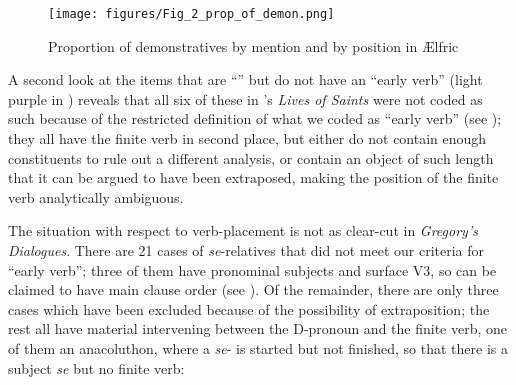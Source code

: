 \documentclass[output=paper,colorlinks,citecolor=brown]{langscibook}
\begin{document}
 \begin{figure}[b]
 \centering
 \texttt{[image: figures/Fig\_2\_prop\_of\_demon.png]}
 \caption{Proportion of demonstratives by mention and by position in Ælfric}
 \label{fig:los:2}
 \end{figure}

A second look at the items that are “” but do not have an “early verb” (light purple in ) reveals that all six of these in 's \textit{Lives of Saints} were not coded as such because of the restricted definition of what we coded as “early verb” (see ); they all have the finite verb in second place, but either do not contain enough constituents to rule out a different analysis, or contain an object of such length that it can be argued to have been extraposed, making the position of the finite verb analytically ambiguous. 

The situation with respect to verb-placement is not as clear-cut in \textit{Gregory's Dialogues}. There are 21 cases of \textit{se}{}-relatives that did not meet our criteria for “early verb”; three of them have pronominal subjects and surface V3, so can be claimed to have main clause order (see ). Of the remainder, there are only three cases which have been excluded because of the possibility of extraposition; the rest all have material intervening between the D-pronoun and the finite verb, one of them an anacoluthon, where a \textit{se}{}- is started but not finished, so that there is a subject \textit{se} but no finite verb:

\z
\end{document}
